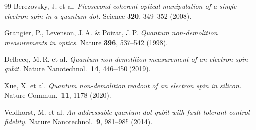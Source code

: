 \begin{thebibliography}{99}
Berezovsky, J. et al.
\textit{Picosecond coherent optical manipulation of a single electron spin in a
quantum dot.}
Science \textbf{320}, 349--352 (2008).

Grangier, P., Levenson, J.\,A. \& Poizat, J.\,P.
\textit{Quantum non-demolition measurements in optics.}
Nature \textbf{396}, 537--542 (1998).

Delbecq, M.\,R. et al.
\textit{Quantum non-demolition measurement of an electron spin qubit.}
Nature Nanotechnol.\ \textbf{14}, 446--450 (2019).

Xue, X. et al.
\textit{Quantum non-demolition readout of an electron spin in silicon.}
Nature Commun.\ \textbf{11}, 1178 (2020).

Veldhorst, M. et al.
\textit{An addressable quantum dot qubit with fault-tolerant control-fidelity.}
Nature Nanotechnol.\ \textbf{9}, 981--985 (2014).

\end{thebibliography}
